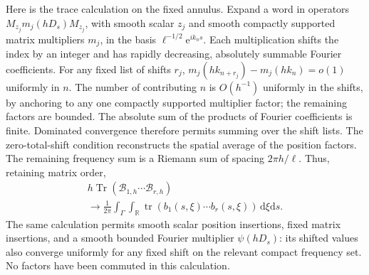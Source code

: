 \documentclass[aps,pra,reprint,superscriptaddress,longbibliography]{revtex4-2}
\newcommand{\Tr}{\operatorname{Tr}}
\newcommand{\dd}{\mathrm d}
\newcommand{\ee}{\mathrm e}
\begin{document}
Here is the trace calculation on the fixed annulus.  Expand a word
in operators $M_{z_j}m_j(hD_s)M_{z_j}$, with smooth scalar $z_j$ and
smooth compactly supported matrix multipliers $m_j$, in the basis
$\ell^{-1/2}\ee^{ik_ns}$.  Each multiplication shifts the index by an
integer and has rapidly decreasing, absolutely summable Fourier
coefficients.  For any fixed list of shifts $r_j$,
$m_j(hk_{n+r_j})-m_j(hk_n)=o(1)$ uniformly in $n$.
The number of contributing $n$ is $O(h^{-1})$ uniformly in the shifts,
by anchoring to any one compactly supported multiplier factor; the
remaining factors are bounded.  The absolute sum of the products of
Fourier coefficients is finite.  Dominated convergence therefore
permits summing over the shift lists.  The zero-total-shift condition
reconstructs the spatial average of the position factors.  The
remaining frequency sum is a Riemann sum of spacing $2\pi h/\ell$.
Thus, retaining matrix order,
\begin{equation}
\begin{gathered}
 h\Tr(\mathcal B_{1,h}\cdots\mathcal B_{r,h})
\\
 \longrightarrow\frac1{2\pi}\int_\Gamma\int_{\mathbb R}
        \operatorname{tr}(b_1(s,\xi)\cdots b_r(s,\xi))
                         \,\dd\xi\dd s.
 \label{sgt:geo:word-law}
\end{gathered}
\end{equation}
The same calculation permits smooth scalar position insertions,
fixed matrix insertions, and a smooth bounded Fourier multiplier
$\psi(hD_s)$: its shifted values also converge uniformly for any
fixed shift on the relevant compact frequency set.  No factors have
been commuted in this calculation.
\end{document}
